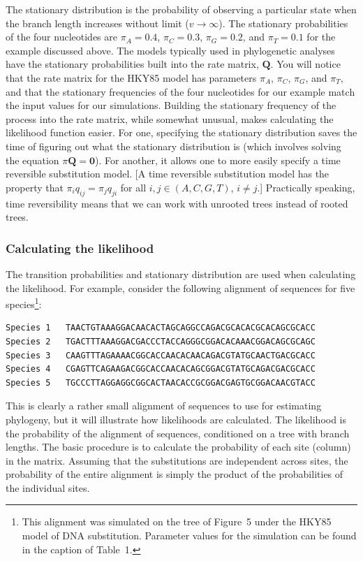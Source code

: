 \documentclass{svmult}
\begin{document}
The stationary distribution is the probability of observing a particular state when the branch
length increases without limit ($v \rightarrow \infty$). The stationary probabilities of the four
nucleotides are $\pi_A = 0.4$, $\pi_C = 0.3$, $\pi_G = 0.2$, and $\pi_T = 0.1$ for the example
discussed above. The models typically used in phylogenetic analyses have the stationary
probabilities built into the rate matrix, ${\mathbf Q}$. You will notice that the rate matrix for
the HKY85 model has parameters $\pi_A$, $\pi_C$, $\pi_G$, and $\pi_T$, and that the stationary
frequencies of the four nucleotides for our example match the input values for our simulations.
Building the stationary frequency of the process into the rate matrix, while somewhat unusual,
makes calculating the likelihood function easier. For one, specifying the stationary distribution
saves the time of figuring out what the stationary distribution is (which involves solving the
equation $\pi {\mathbf Q} = {\mathbf 0}$). For another, it allows one to more easily specify  a
time reversible substitution model.  [A time reversible substitution model has the property that
$\pi_i q_{ij} = \pi_j q_{ji}$ for all $i, j \in (A,C,G,T)$, $i \neq j$.] Practically speaking, time
reversibility means that we can work with unrooted trees instead of rooted trees.

\subsubsection{Calculating the likelihood} The transition probabilities and stationary distribution
are used when calculating the likelihood. For example, consider the following alignment of
sequences for five species\footnote{This alignment was simulated on the tree of Figure~5 under the
HKY85 model of DNA substitution. Parameter values for the simulation can be found in the caption of
Table~1.}:
\begin{verbatim}
Species 1   TAACTGTAAAGGACAACACTAGCAGGCCAGACGCACACGCACAGCGCACC
Species 2   TGACTTTAAAGGACGACCCTACCAGGGCGGACACAAACGGACAGCGCAGC
Species 3   CAAGTTTAGAAAACGGCACCAACACAACAGACGTATGCAACTGACGCACC
Species 4   CGAGTTCAGAAGACGGCACCAACACAGCGGACGTATGCAGACGACGCACC
Species 5   TGCCCTTAGGAGGCGGCACTAACACCGCGGACGAGTGCGGACAACGTACC

\end{verbatim}
This is clearly a rather small alignment of sequences to use for estimating phylogeny, but it will
illustrate how likelihoods are calculated. The likelihood is the probability of the alignment of
sequences, conditioned on a tree with branch lengths. The basic procedure is to calculate the
probability of each site (column) in the matrix. Assuming that the substitutions are independent
across sites, the probability of the entire alignment is simply the product of the probabilities of
the individual sites. 
\end{document}
